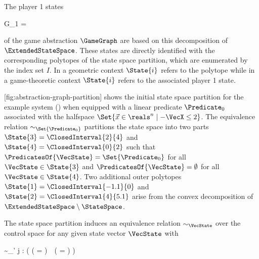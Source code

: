     The player 1 states

    \startformula
        G_1 = 
    \stopformula

    of the game abstraction $\GameGraph$ are based on this decomposition of $\ExtendedStateSpace$.
    These states are directly identified with the corresponding polytopes of the state space partition, which are enumerated by the index set $I$.
    In a geometric context $\State{i}$ refers to the polytope while in a game-theoretic context $\State{i}$ refers to the associated player 1 state.


    [fig:abstraction-graph-partition] shows the initial state space partition for the example system () when equipped with a linear predicate $\Predicate_0$ associated with the halfspace $ \Set{ \Vec{x} \in \reals^n \mid -\VecX \leq 2 } $.
    The equivalence relation $\sim_{\Set{\Predicate_0}}$ partitions the state space into two parts $\State{3} = \ClosedInterval{2}{4}$ and $\State{4} = \ClosedInterval{0}{2}$ such that $\PredicatesOf{\VecState} = \Set{\Predicate_0}$ for all $\VecState \in \State{3}$ and $\PredicatesOf{\VecState} = \emptyset$ for all $\VecState \in \State{4}$.
    Two additional outer polytopes $\State{1} = \ClosedInterval{-1.1}{0}$ and $\State{2} = \ClosedInterval{4}{5.1}$ arise from the convex decomposition of $\ExtendedStateSpace \setminus \StateSpace$.

    The state space partition induces an equivalence relation $\sim_\VecState$ over the control space for any given state vector $\VecState$ with

    \startformula
        \VecControl \sim_\VecState \VecControl' \;\Longleftrightarrow\;
        \forall j \in \StateIndices: \Big(
            ( \Posterior{\VecState}{\VecControl} \cap {} = \emptyset ) \,\leftrightarrow\,
            (  \cap {} = \emptyset )
        \Big) \EndComma
    \stopformula

